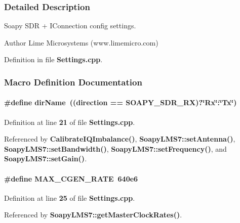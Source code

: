 \subsubsection{Detailed Description}
Soapy S\+DR + I\+Connection config settings. 

\begin{DoxyAuthor}{Author}
Lime Microsystems (www.\+limemicro.\+com) 
\end{DoxyAuthor}


Definition in file {\bf Settings.\+cpp}.



\subsubsection{Macro Definition Documentation}
\paragraph[{dir\+Name}]{\setlength{\rightskip}{0pt plus 5cm}\#define dir\+Name~((direction == S\+O\+A\+P\+Y\+\_\+\+S\+D\+R\+\_\+\+RX)?\char`\"{}Rx\char`\"{}\+:\char`\"{}Tx\char`\"{})}\label{Settings_8cpp_a58306ca9bc3aabe786013c42fc5ff9ba}


Definition at line {\bf 21} of file {\bf Settings.\+cpp}.



Referenced by {\bf Calibrate\+I\+Q\+Imbalance()}, {\bf Soapy\+L\+M\+S7\+::set\+Antenna()}, {\bf Soapy\+L\+M\+S7\+::set\+Bandwidth()}, {\bf Soapy\+L\+M\+S7\+::set\+Frequency()}, and {\bf Soapy\+L\+M\+S7\+::set\+Gain()}.

\paragraph[{M\+A\+X\+\_\+\+C\+G\+E\+N\+\_\+\+R\+A\+TE}]{\setlength{\rightskip}{0pt plus 5cm}\#define M\+A\+X\+\_\+\+C\+G\+E\+N\+\_\+\+R\+A\+TE~640e6}\label{Settings_8cpp_a2a423988d080ce0e61bd0fec3ea18e23}


Definition at line {\bf 25} of file {\bf Settings.\+cpp}.



Referenced by {\bf Soapy\+L\+M\+S7\+::get\+Master\+Clock\+Rates()}.

